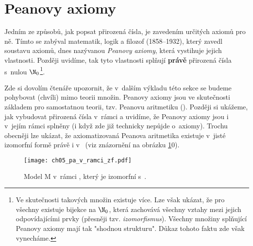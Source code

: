 \section{Peanovy axiomy}\label{sec:peanovy_axiomy}
Jedním ze způsobů, jak popsat přirozená čísla, je zavedením určitých axiomů pro ně. Tímto se zabýval matematik, logik a filozof  (1858--1932), který zavedl soustavu axiomů, dnes nazývanou \emph{Peanovy axiomy}, která vystihuje jejich vlastnosti. Později uvidíme, tak tyto vlastnosti splňují \textbf{právě} přirozená čísla s~nulou $\N_0$\footnote{Ve skutečnosti takových množin existuje více. Lze však ukázat, že pro všechny existuje bijekce na $\N_0$, která zachovává všechny vztahy mezi jejich odpovídajícími prvky (přesněji tzv. \emph{izomorfismus}). Všechny množiny splňující Peanovy axiomy mají tak "shodnou strukturu". Důkaz tohoto faktu zde však vynecháme.}.\par
Zde si dovolím čtenáře upozornit, že v~dalším výkladu této sekce se budeme pohybovat (chvíli) mimo teorii množin. Peanovy axiomy jsou ve skutečnosti základem pro samostatnou teorii, tzv. Peanovu aritmetiku (\PA). Později si ukážeme, jak vybudovat přirozená čísla v~rámci \ZF{} a uvidíme, že Peanovy axiomy jsou i v~jejím rámci splněny (i když zde již technicky nepůjde o~axiomy). Trochu obecněji lze ukázat, že axiomatizovaná Peanova aritmetika existuje v~jisté izomorfní formě právě i v~\ZF{} (viz znázornění na obrázku \ref{fig:pa_v_ramci_zf}0).
\begin{figure}[H]
    \centering
    \texttt{[image: ch05\_pa\_v\_ramci\_zf.pdf]}
    \caption{Model \textsf{M} v~rámci \ZF{}, který je izomorfní s~\PA.}
    \label{fig:pa_v_ramci_zf}
\end{figure}
\medskip

